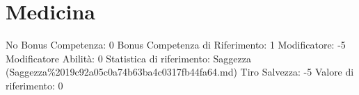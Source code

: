 \section{Medicina}\label{medicina}

\begin{description}
\tightlist
\item[Tags: ABI]
No Bonus Competenza: 0 Bonus Competenza di Riferimento: 1 Modificatore:
-5 Modificatore Abilità: 0 Statistica di riferimento: Saggezza
(Saggezza\%2019c92a05c0a74b63ba4c0317fb44fa64.md) Tiro Salvezza: -5
Valore di riferimento: 0
\end{description}
